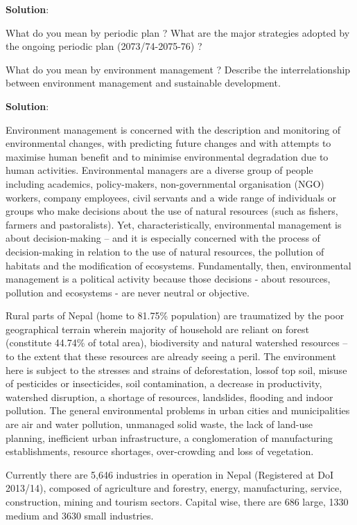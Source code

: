 \documentclass[
]{book}
\newcommand{\question}{\item}
\newenvironment{solution}{ {\bfseries Solution}:}{}
\begin{document}
\begin{questions}
\begin{solution}
\end{solution}

\question What do you mean by periodic plan ? What are the major strategies adopted by the ongoing periodic plan (2073/74-2075-76) ?

\question What do you mean by environment management ? Describe the interrelationship between environment management and sustainable development.

\begin{solution}

Environment management is concerned with the description and monitoring of environmental changes, with predicting future changes and with attempts to maximise human benefit and to minimise environmental degradation due to human activities. Environmental managers are a diverse group of people including academics, policy-makers, non-governmental organisation (NGO) workers, company employees, civil servants and a wide range of individuals or groups who make decisions about the use of natural resources (such as fishers, farmers and pastoralists). Yet, characteristically, environmental management is about decision-making -- and it is especially concerned with the process of decision-making in relation to the use of natural resources, the pollution of habitats and the modification of ecosystems. Fundamentally, then, environmental management is a political activity because those decisions - about resources, pollution and ecosystems - are never neutral or objective.

Rural parts of Nepal (home to 81.75\% population) are traumatized by the poor geographical terrain wherein majority of household are reliant on forest (constitute 44.74\% of total area), biodiversity and natural watershed resources -- to the extent that these resources are already seeing a peril. The environment here is subject to the stresses and strains of deforestation, lossof top soil, misuse of pesticides or insecticides, soil contamination, a decrease in productivity, watershed disruption, a shortage of resources, landslides, flooding and indoor pollution. The general environmental problems in urban cities and municipalities are air and water pollution, unmanaged solid waste, the lack of land-use planning, inefficient urban infrastructure, a conglomeration of manufacturing establishments, resource shortages, over-crowding and loss of vegetation.

Currently there are 5,646 industries in operation in Nepal (Registered at DoI 2013/14), composed of agriculture and forestry, energy, manufacturing, service, construction, mining and tourism sectors. Capital wise, there are 686 large, 1330 medium and 3630 small industries.


\end{solution}
\end{questions}
\end{document}
